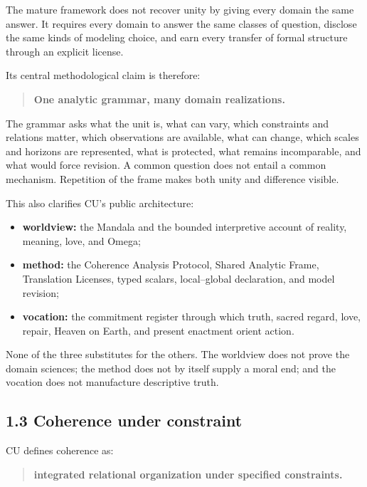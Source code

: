 \documentclass[
  11pt,
]{article}
\providecommand{\tightlist}{%
  \setlength{\itemsep}{0pt}\setlength{\parskip}{0pt}}
\begin{document}
The mature framework does not recover unity by giving every domain the
same answer. It requires every domain to answer the same classes of
question, disclose the same kinds of modeling choice, and earn every
transfer of formal structure through an explicit license.

Its central methodological claim is therefore:

\begin{quote}
\textbf{One analytic grammar, many domain realizations.}
\end{quote}

The grammar asks what the unit is, what can vary, which constraints and
relations matter, which observations are available, what can change,
which scales and horizons are represented, what is protected, what
remains incomparable, and what would force revision. A common question
does not entail a common mechanism. Repetition of the frame makes both
unity and difference visible.

This also clarifies CU's public architecture:

\begin{itemize}
\tightlist
\item
  \textbf{worldview:} the Mandala and the bounded interpretive account
  of reality, meaning, love, and Omega;
\item
  \textbf{method:} the Coherence Analysis Protocol, Shared Analytic
  Frame, Translation Licenses, typed scalars, local--global declaration,
  and model revision;
\item
  \textbf{vocation:} the commitment register through which truth, sacred
  regard, love, repair, Heaven on Earth, and present enactment orient
  action.
\end{itemize}

None of the three substitutes for the others. The worldview does not
prove the domain sciences; the method does not by itself supply a moral
end; and the vocation does not manufacture descriptive truth.

\subsection{1.3 Coherence under
constraint}\label{coherence-under-constraint}

CU defines coherence as:

\begin{quote}
\textbf{integrated relational organization under specified constraints.}
\end{quote}
\end{document}
